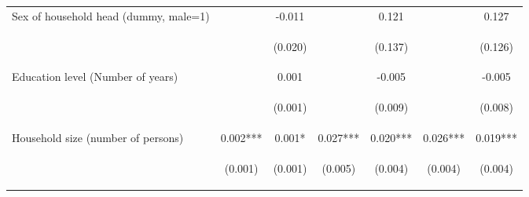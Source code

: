 \begin{center}
\begin{tabular}{lcccccc}
Sex of household head (dummy, male=1) &  & -0.011 &  & 0.121 &  & 0.127 \\
\vspace{4pt} & \begin{footnotesize}\end{footnotesize} & \begin{footnotesize}(0.020)\end{footnotesize} & \begin{footnotesize}\end{footnotesize} & \begin{footnotesize}(0.137)\end{footnotesize} & \begin{footnotesize}\end{footnotesize} & \begin{footnotesize}(0.126)\end{footnotesize} \\
Education level (Number of years) &  & 0.001 &  & -0.005 &  & -0.005 \\
\vspace{4pt} & \begin{footnotesize}\end{footnotesize} & \begin{footnotesize}(0.001)\end{footnotesize} & \begin{footnotesize}\end{footnotesize} & \begin{footnotesize}(0.009)\end{footnotesize} & \begin{footnotesize}\end{footnotesize} & \begin{footnotesize}(0.008)\end{footnotesize} \\
Household size (number of persons) & 0.002*** & 0.001* & 0.027*** & 0.020*** & 0.026*** & 0.019*** \\
\vspace{4pt} & \begin{footnotesize}(0.001)\end{footnotesize} & \begin{footnotesize}(0.001)\end{footnotesize} & \begin{footnotesize}(0.005)\end{footnotesize} & \begin{footnotesize}(0.004)\end{footnotesize} & \begin{footnotesize}(0.004)\end{footnotesize} & \begin{footnotesize}(0.004)\end{footnotesize} \\

\end{tabular}
\end{center}
